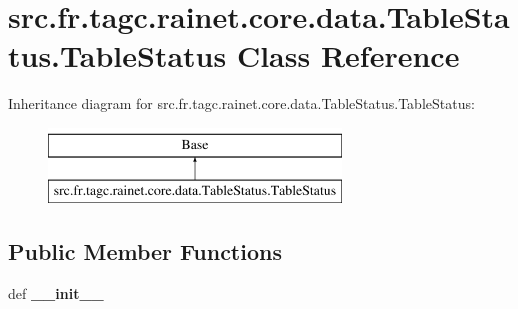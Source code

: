 \hypertarget{classsrc_1_1fr_1_1tagc_1_1rainet_1_1core_1_1data_1_1TableStatus_1_1TableStatus}{\section{src.\-fr.\-tagc.\-rainet.\-core.\-data.\-Table\-Status.\-Table\-Status Class Reference}
\label{classsrc_1_1fr_1_1tagc_1_1rainet_1_1core_1_1data_1_1TableStatus_1_1TableStatus}
}
Inheritance diagram for src.\-fr.\-tagc.\-rainet.\-core.\-data.\-Table\-Status.\-Table\-Status\-:\begin{figure}[H]
\begin{center}
\leavevmode
\includegraphics[height=2.000000cm]{classsrc_1_1fr_1_1tagc_1_1rainet_1_1core_1_1data_1_1TableStatus_1_1TableStatus}
\end{center}
\end{figure}
\subsection*{Public Member Functions}
\begin{DoxyCompactItemize}
\item 
\hypertarget{classsrc_1_1fr_1_1tagc_1_1rainet_1_1core_1_1data_1_1TableStatus_1_1TableStatus_abf59f174816d6ec2108d0500df7c00c7}{def {\bfseries \-\_\-\-\_\-init\-\_\-\-\_\-}}\label{classsrc_1_1fr_1_1tagc_1_1rainet_1_1core_1_1data_1_1TableStatus_1_1TableStatus_abf59f174816d6ec2108d0500df7c00c7}

\end{DoxyCompactItemize}
